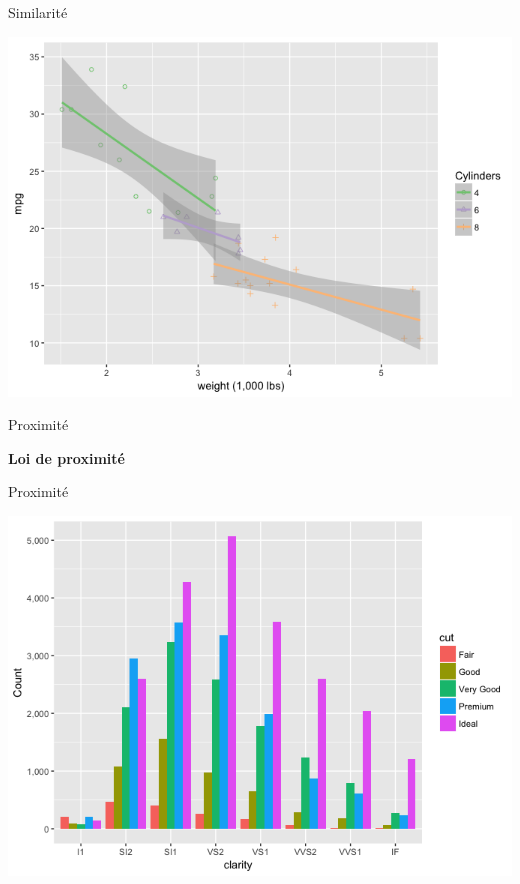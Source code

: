 \documentclass[french]{beamer}
\begin{document}
\begin{frame}{Similarité}
\begin{center}
	\includegraphics[height=0.8\textheight]{sim7}
\end{center}
\end{frame}

\begin{frame}{Proximité}
\begin{center}\begin{Huge}\textbf{
			Loi de proximité
}\end{Huge}\end{center}
\end{frame}

\begin{frame}{Proximité}
\begin{center}
	\includegraphics[height=0.8\textheight]{diamonds_bat}
\end{center}
\end{frame}
\end{document}
